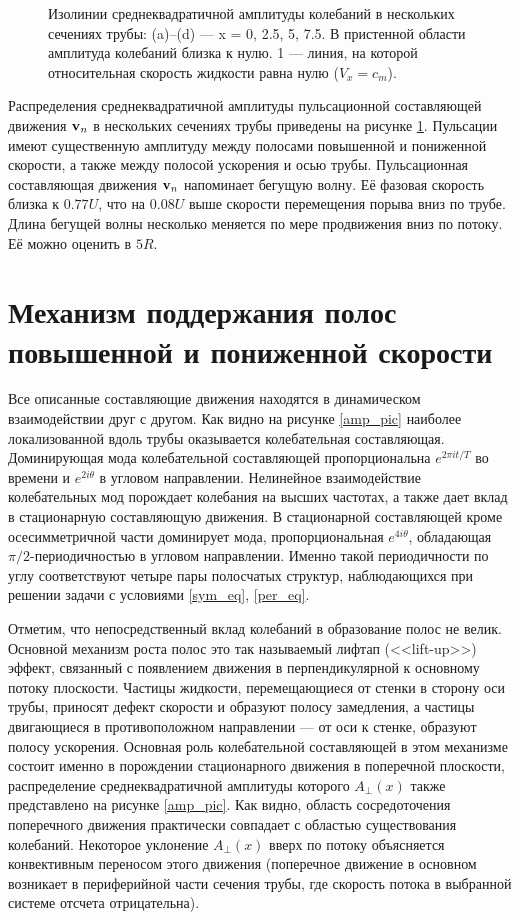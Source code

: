 \begin{figure}[h]
\caption{Изолинии среднеквадратичной амплитуды колебаний в нескольких сечениях трубы: (a)--(d) --- x = 0, 2.5, 5, 7.5. В пристенной области амплитуда колебаний близка к нулю. 1 --- линия, на которой относительная скорость жидкости равна нулю ($V_{x} = c_m$).}
\label{puls_cs_pic}
\end{figure}

Распределения среднеквадратичной амплитуды пульсационной составляющей движения $\mathbf{v}_n$ в нескольких сечениях трубы приведены на рисунке \ref{puls_cs_pic}. Пульсации имеют существенную амплитуду между полосами повышенной и пониженной скорости, а также между полосой ускорения и осью трубы. Пульсационная составляющая движения $\mathbf{v}_n$ напоминает бегущую волну. Её фазовая скорость близка к $0.77U$, что на $0.08U$ выше скорости перемещения порыва вниз по трубе. Длина бегущей волны несколько меняется по мере продвижения вниз по потоку. Её можно оценить в $5R$. 


\section{Механизм поддержания полос повышенной и пониженной скорости} 

Все описанные составляющие движения находятся в динамическом взаимодействии друг с другом. Как видно на рисунке \ref{amp_pic} наиболее локализованной вдоль трубы оказывается колебательная составляющая. Доминирующая мода колебательной составляющей пропорциональна $e^{2\pi it/T}$ во времени и $e^{2i\theta}$ в угловом направлении. Нелинейное взаимодействие колебательных мод порождает колебания на высших частотах, а также дает вклад в стационарную составляющую движения. В стационарной составляющей кроме осесимметричной части доминирует мода, пропорциональная $e^{4i\theta}$, обладающая $\pi/2$-периодичностью в угловом направлении. Именно такой периодичности по углу соответствуют четыре пары полосчатых структур, наблюдающихся при решении задачи с условиями \eqref{sym_eq}, \eqref{per_eq}.

Отметим, что непосредственный вклад колебаний в образование полос не велик. Основной механизм роста полос это так называемый лифтап (<<lift-up>>) эффект, связанный с появлением движения в перпендикулярной к основному потоку плоскости. Частицы жидкости, перемещающиеся от стенки в сторону оси трубы, приносят дефект скорости и образуют полосу замедления, а частицы двигающиеся в противоположном направлении --- от оси к стенке, образуют полосу ускорения. Основная роль колебательной составляющей в этом механизме состоит именно в порождении стационарного движения в поперечной плоскости, распределение среднеквадратичной амплитуды которого $A_{\perp}(x)$ также представлено на рисунке \ref{amp_pic}. Как видно, область сосредоточения поперечного движения практически совпадает с областью существования колебаний. Некоторое уклонение $A_{\perp}(x)$ вверх по потоку объясняется конвективным переносом этого движения (поперечное движение в основном возникает в периферийной части сечения трубы, где скорость потока в выбранной системе отсчета отрицательна).

